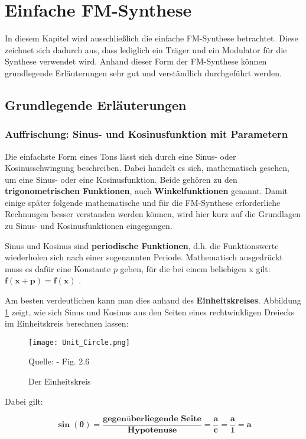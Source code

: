 \section{Einfache FM-Synthese}
In diesem Kapitel wird ausschließlich die einfache FM-Synthese betrachtet. Diese zeichnet sich dadurch aus, dass lediglich ein Träger und ein Modulator für die Synthese verwendet wird. Anhand dieser Form der FM-Synthese können grundlegende Erläuterungen sehr gut und verständlich durchgeführt werden.
\label{einfacheFM}
\FloatBarrier
\subsection{Grundlegende Erläuterungen}
\subsubsection{Auffrischung: Sinus- und Kosinusfunktion mit Parametern}
Die einfachste Form eines Tons lässt sich durch eine Sinus- oder Kosinusschwingung beschreiben. Dabei handelt es sich, mathematisch gesehen, um eine Sinus- oder eine Kosinusfunktion. Beide gehören zu den \textbf{trigonometrischen Funktionen}, auch \textbf{Winkelfunktionen} genannt. Damit einige später folgende mathematische und für die FM-Synthese erforderliche Rechnungen besser verstanden werden können, wird hier kurz auf die Grundlagen zu Sinus- und Kosinusfunktionen eingegangen. 

Sinus und Kosinus sind \textbf{periodische Funktionen}, d.h. die Funktionswerte wiederholen sich nach einer sogenannten Periode. Mathematisch ausgedrückt muss es dafür eine Konstante $p$  geben, für die bei einem beliebigen x gilt: $\bm{f(x + p) =  f(x)}$ .

Am besten verdeutlichen kann man dies anhand des \textbf{Einheitskreises}. Abbildung \ref{fig:unitcircle} zeigt, wie sich Sinus und Kosinus aus den Seiten eines rechtwinkligen Dreiecks im Einheitskreis berechnen lassen:

\begin{figure} [ht]
\centering
\texttt{[image: Unit\_Circle.png]}
\caption{Der Einheitskreis}
\label{fig:unitcircle}
Quelle: \cite{fmtheory} - Fig. 2.6
\end{figure}

Dabei gilt: 

\begin{equation}\bm{\sin(\theta) = \frac{\textbf{gegenüberliegende Seite}}{\textbf{Hypotenuse}} = \frac{a}{c} = \frac{a}{1} = a}\end{equation}

